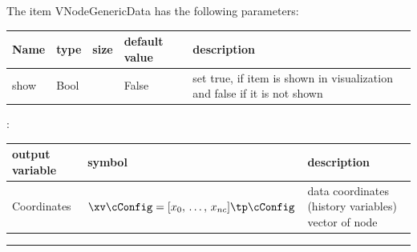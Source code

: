 \noindent The item VNodeGenericData has the following parameters:
\begin{center}
  \footnotesize
  \begin{longtable}{| p{4.5cm} | p{2.5cm} | p{0.5cm} | p{2.5cm} | p{6cm} |}
    \hline
    \bf Name & \bf type & \bf size & \bf default value & \bf description \\ \hline
    show &     Bool &      &     False &     set true, if item is shown in visualization and false if it is not shown\\ \hline
\end{longtable}
\end{center}

:
\begin{center}
\footnotesize
\begin{longtable}{| p{5cm} | p{5cm} | p{6cm} |} 
\hline
\bf output variable & \bf symbol & \bf description \\ \hline
Coordinates & $\xv\cConfig = [x_0,\,\ldots,\,x_{nc}]\tp\cConfig$ & data coordinates (history variables) vector of node\\ \hline
\end{longtable}
\end{center}
\par\noindent\rule{\textwidth}{0.4pt}
\label{description_NodeGenericData}
